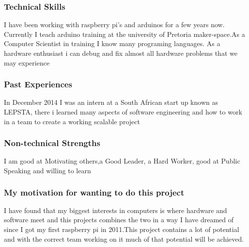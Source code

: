 \documentclass[a4paper,12pt]{article}
\begin{document}
			\subsubsection{Technical Skills}
			I have been working with raspberry pi's and arduinos for a few years now. Currently I teach arduino training at the university of Pretoria maker-space.As a Computer Scientist in training I know many programing languages. As a hardware enthusiast i can debug and fix almost all hardware problems that we may experience
			\subsubsection{Past Experiences}
			In December 2014 I was an intern at a South African start up known as LEPSTA, there i learned many aspects of software engineering and how to work in a team to create a working scalable project
			\subsubsection{Non-technical Strengths}
			I am good at Motivating others,a Good Leader, a Hard Worker, good at  Public Speaking and willing to learn  			
			\subsubsection{My motivation for wanting to do this project}
			I have found that my biggest interests in computers is where hardware and software meet and this projects combines the two in a way I have dreamed of since I got my first raspberry pi in 2011.This project contains a lot of potential and with the correct team working on it much of that potential will be achieved.
		
		\newpage
\end{document}
